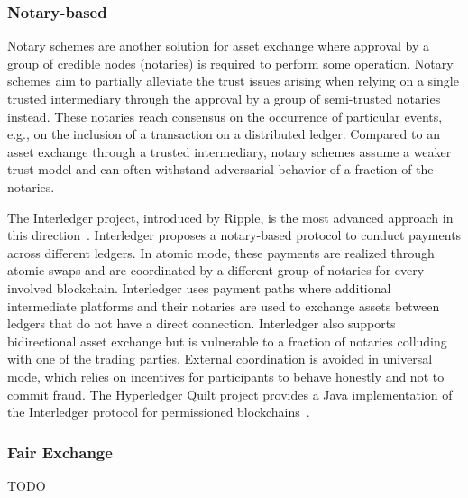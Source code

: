 \subsubsection{Notary-based}
Notary schemes are another solution for asset exchange where approval by a group of credible nodes (notaries) is required to perform some operation.
Notary schemes aim to partially alleviate the trust issues arising when relying on a single trusted intermediary through the approval by a group of semi-trusted notaries instead.
These notaries reach consensus on the occurrence of particular events, e.g., on the inclusion of a transaction on a distributed ledger.
Compared to an asset exchange through a trusted intermediary, notary schemes assume a weaker trust model and can often withstand adversarial behavior of a fraction of the notaries.

The Interledger project, introduced by Ripple, is the most advanced approach in this direction~\cite{thomas2015protocol}.
Interledger proposes a notary-based protocol to conduct payments across different ledgers.
In atomic mode, these payments are realized through atomic swaps and are coordinated by a different group of notaries for every involved blockchain.
Interledger uses payment paths where additional intermediate platforms and their notaries are used to exchange assets between ledgers that do not have a direct connection.
Interledger also supports bidirectional asset exchange but is vulnerable to a fraction of notaries colluding with one of the trading parties.
External coordination is avoided in universal mode, which relies on incentives for participants to behave honestly and not to commit fraud.
The Hyperledger Quilt project provides a Java implementation of the Interledger protocol for permissioned blockchains~\cite{hyperledgerquilt}.

\subsubsection{Fair Exchange}
TODO

